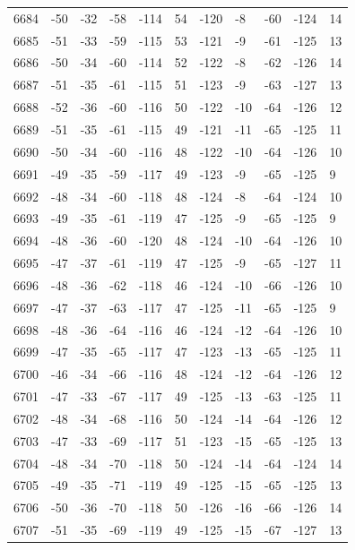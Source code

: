 \begin{table}[H]
\begin{tabular}{lllllllllll}
6684 & -50 & -32 & -58 & -114 & 54 & -120 & -8 & -60 & -124 & 14 \\
6685 & -51 & -33 & -59 & -115 & 53 & -121 & -9 & -61 & -125 & 13 \\
6686 & -50 & -34 & -60 & -114 & 52 & -122 & -8 & -62 & -126 & 14 \\
6687 & -51 & -35 & -61 & -115 & 51 & -123 & -9 & -63 & -127 & 13 \\
6688 & -52 & -36 & -60 & -116 & 50 & -122 & -10 & -64 & -126 & 12 \\
6689 & -51 & -35 & -61 & -115 & 49 & -121 & -11 & -65 & -125 & 11 \\
6690 & -50 & -34 & -60 & -116 & 48 & -122 & -10 & -64 & -126 & 10 \\
6691 & -49 & -35 & -59 & -117 & 49 & -123 & -9 & -65 & -125 & 9 \\
6692 & -48 & -34 & -60 & -118 & 48 & -124 & -8 & -64 & -124 & 10 \\
6693 & -49 & -35 & -61 & -119 & 47 & -125 & -9 & -65 & -125 & 9 \\
6694 & -48 & -36 & -60 & -120 & 48 & -124 & -10 & -64 & -126 & 10 \\
6695 & -47 & -37 & -61 & -119 & 47 & -125 & -9 & -65 & -127 & 11 \\
6696 & -48 & -36 & -62 & -118 & 46 & -124 & -10 & -66 & -126 & 10 \\
6697 & -47 & -37 & -63 & -117 & 47 & -125 & -11 & -65 & -125 & 9 \\
6698 & -48 & -36 & -64 & -116 & 46 & -124 & -12 & -64 & -126 & 10 \\
6699 & -47 & -35 & -65 & -117 & 47 & -123 & -13 & -65 & -125 & 11 \\
6700 & -46 & -34 & -66 & -116 & 48 & -124 & -12 & -64 & -126 & 12 \\
6701 & -47 & -33 & -67 & -117 & 49 & -125 & -13 & -63 & -125 & 11 \\
6702 & -48 & -34 & -68 & -116 & 50 & -124 & -14 & -64 & -126 & 12 \\
6703 & -47 & -33 & -69 & -117 & 51 & -123 & -15 & -65 & -125 & 13 \\
6704 & -48 & -34 & -70 & -118 & 50 & -124 & -14 & -64 & -124 & 14 \\
6705 & -49 & -35 & -71 & -119 & 49 & -125 & -15 & -65 & -125 & 13 \\
6706 & -50 & -36 & -70 & -118 & 50 & -126 & -16 & -66 & -126 & 14 \\
6707 & -51 & -35 & -69 & -119 & 49 & -125 & -15 & -67 & -127 & 13 \\

\end{tabular}
\end{table}
